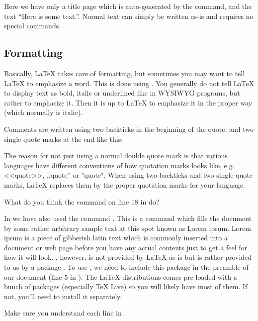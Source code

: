  Here we have only a title page which is auto-generated by the \latexin{\maketitle} command, and the text ``Here is some text.''. Normal text can simply be written as-is and requires no special commands.


\subsection{Formatting}
Basically, \LaTeX{} takes care of formatting, but sometimes you may want to tell \LaTeX{} to emphasize a word. This is done using \latexin{\emph}. You generally do not tell \LaTeX{} to display text as bold, italic or underlined like in WYSIWYG programs, but rather to emphasize it. Then it is up to \LaTeX{} to emphasize it in the proper way (which normally is italic).

Comments are written using two backticks in the beginning of the quote, and two single quote marks at the end like this:


The reason for not just using a normal double quote mark is that various languages have different conventions of how quotation marks looks like, e.g. <<quote>>, ,,quote'' or "quote". When using two backticks and two single-quote marks, \LaTeX{} replaces them by the proper quotation marks for your language.

What do you think the command \latexin{\LaTeX{}} on line 18 in  do?

In  we have also used the command \latexin{\lipsum}. This is a command which fills the document by some rather arbitrary sample text at this spot known as Lorem ipsum. Lorem ipsum is a piece of gibberish latin text which is commonly inserted into a document or web page before you have any actual contents just to get a feel for how it will look. \latexin{\lipsum}, however, is not provided by \LaTeX{} as-is but is rather provided to us by a package . To use \latexin{\lipsum}, we need to include this package in the preamble of our document (line 5 in ). The \LaTeX{}-distributions comes pre-loaded with a bunch of packages (especially TeX Live) so you will likely have most of them. If not, you'll need to install it separately.

Make sure you understand each line in . 

